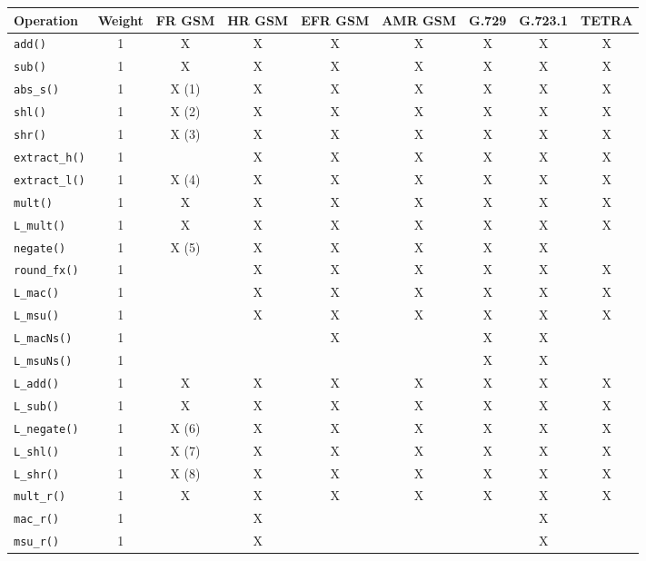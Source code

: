 \begin{table}[th]
\begin{center}
\footnotesize
\begin{tabular}{|l|c|c|c|c|c|c|c|c|}
\hline
Operation &Weight &FR GSM &HR GSM &EFR GSM &AMR GSM &G.729 &G.723.1 &TETRA\\
\hline \hline
{\tt add()}     &1 &X &X &X &X &X &X &X\\
{\tt sub()}     &1 &X &X &X &X &X &X &X\\
{\tt abs\_s()}  &1 &X (1) &X &X &X &X &X &X\\
{\tt shl()}     &1 &X (2) &X &X &X &X &X &X\\
{\tt shr()}     &1 &X (3) &X &X &X &X &X &X\\
{\tt extract\_h()}      &1 & &X &X &X &X &X &X\\
{\tt extract\_l()}      &1 &X (4) &X &X &X &X &X &X\\
{\tt mult()}    &1 &X &X &X &X &X &X &X\\
{\tt L\_mult()} &1 &X &X &X &X &X &X &X\\
{\tt negate()}  &1 &X (5) &X &X &X &X &X & \\
{\tt round\_fx()}   &1 & &X &X &X &X &X &X\\
{\tt L\_mac()}  &1 & &X &X &X &X &X &X\\
{\tt L\_msu()}  &1 & &X &X &X &X &X &X\\
{\tt L\_macNs()}        &1 & & &X & &X &X & \\
{\tt L\_msuNs()}        &1 & & & & &X &X & \\
{\tt L\_add()}  &1 &X &X &X &X &X &X &X\\
{\tt L\_sub()}  &1 &X &X &X &X &X &X &X\\
{\tt L\_negate()}       &1 &X (6) &X &X &X &X &X &X\\
{\tt L\_shl()}  &1 &X (7) &X &X &X &X &X &X\\
{\tt L\_shr()}  &1 &X (8) &X &X &X &X &X &X\\
{\tt mult\_r()} &1 &X &X &X &X &X &X &X\\
{\tt mac\_r()}  &1 & &X & & & &X & \\
{\tt msu\_r()}  &1 & &X & & & &X & \\

\end{tabular}
\end{center}
\end{table}
